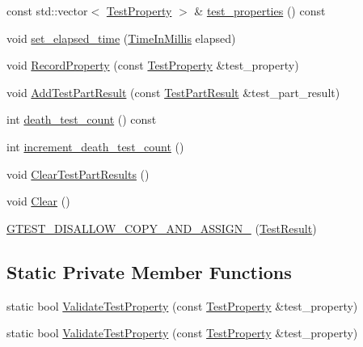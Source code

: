 \begin{DoxyCompactItemize}
\item 
const std\-::vector$<$ \hyperlink{classtesting_1_1TestProperty}{\-Test\-Property} $>$ \& \hyperlink{classtesting_1_1TestResult_abf01bb63648ec8989aebbdda6f198fe5}{test\-\_\-properties} () const 
\item 
void \hyperlink{classtesting_1_1TestResult_a0ca28ac81670a01fff5c6660e78065bb}{set\-\_\-elapsed\-\_\-time} (\hyperlink{namespacetesting_a338e9fd9474f0d8fafcb28b05f66a630}{\-Time\-In\-Millis} elapsed)
\item 
void \hyperlink{classtesting_1_1TestResult_aaeadbc79a8d2cc722ecffc52b03c3a08}{\-Record\-Property} (const \hyperlink{classtesting_1_1TestProperty}{\-Test\-Property} \&test\-\_\-property)
\item 
void \hyperlink{classtesting_1_1TestResult_a3fac5d4edaec29072c5e9d735434471a}{\-Add\-Test\-Part\-Result} (const \hyperlink{classtesting_1_1TestPartResult}{\-Test\-Part\-Result} \&test\-\_\-part\-\_\-result)
\item 
int \hyperlink{classtesting_1_1TestResult_a7471d1e687130ebf97805327c74bf216}{death\-\_\-test\-\_\-count} () const 
\item 
int \hyperlink{classtesting_1_1TestResult_ab32dced99547d83699c327dc67d45f96}{increment\-\_\-death\-\_\-test\-\_\-count} ()
\item 
void \hyperlink{classtesting_1_1TestResult_a56db858ea9f9b0de772699a2669a7ede}{\-Clear\-Test\-Part\-Results} ()
\item 
void \hyperlink{classtesting_1_1TestResult_aa71d36872f416feaa853788a7a7a7ef8}{\-Clear} ()
\item 
\hyperlink{classtesting_1_1TestResult_a7efb1b6292dd7621bbc29cee95b17f4c}{\-G\-T\-E\-S\-T\-\_\-\-D\-I\-S\-A\-L\-L\-O\-W\-\_\-\-C\-O\-P\-Y\-\_\-\-A\-N\-D\-\_\-\-A\-S\-S\-I\-G\-N\-\_\-} (\hyperlink{classtesting_1_1TestResult}{\-Test\-Result})
\end{DoxyCompactItemize}
\subsection*{\-Static \-Private \-Member \-Functions}
\begin{DoxyCompactItemize}
\item 
static bool \hyperlink{classtesting_1_1TestResult_a9f37a30b58b448cad1c543e1704694e7}{\-Validate\-Test\-Property} (const \hyperlink{classtesting_1_1TestProperty}{\-Test\-Property} \&test\-\_\-property)
\item 
static bool \hyperlink{classtesting_1_1TestResult_a24c20cb861b24053c48a4576ee7fa865}{\-Validate\-Test\-Property} (const \hyperlink{classtesting_1_1TestProperty}{\-Test\-Property} \&test\-\_\-property)
\end{DoxyCompactItemize}
